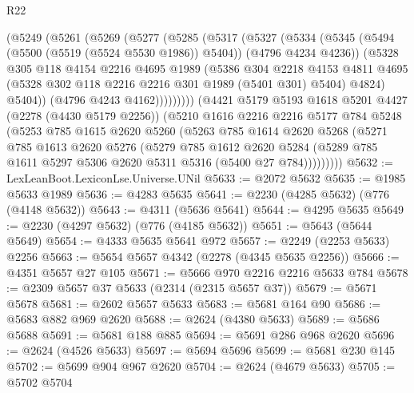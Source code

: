 \begin{lexlean}{R22}
\begin{coremodule}
        (@5249
          (@5261
            (@5269
              (@5277
                (@5285
                  (@5317
                    (@5327
                      (@5334
                        (@5345
                          (@5494 (@5500 (@5519 (@5524 @5530 @1986)) @5404))
                          (@4796 @4234 @4236))
                        (@5328
                          @305
                          @118
                          @4154
                          @2216
                          @4695
                          @1989
                          (@5386
                            @304
                            @2218
                            @4153
                            @4811
                            @4695
                            (@5328 @302 @118 @2216 @2216 @301 @1989 (@5401 @301) @5404)
                            @4824)
                          @5404))
                      (@4796 @4243 @4162)))))))))
      (@4421
        @5179
        @5193
        @1618
        @5201
        @4427
        (@2278 (@4430 @5179 @2256))
        (@5210
          @1616
          @2216
          @2216
          @5177
          @784
          @5248
          (@5253
            @785
            @1615
            @2620
            @5260
            (@5263
              @785
              @1614
              @2620
              @5268
              (@5271
                @785
                @1613
                @2620
                @5276
                (@5279
                  @785
                  @1612
                  @2620
                  @5284
                  (@5289 @785 @1611 @5297 @5306 @2620 @5311 @5316 (@5400 @27 @784)))))))))
@5632 := LexLeanBoot.LexiconLse.Universe.UNil
@5633 := @2072 @5632
@5635 := @1985 @5633 @1989
@5636 := @4283 @5635
@5641 := @2230 (@4285 @5632) (@776 (@4148 @5632))
@5643 := @4311 (@5636 @5641)
@5644 := @4295 @5635
@5649 := @2230 (@4297 @5632) (@776 (@4185 @5632))
@5651 := @5643 (@5644 @5649)
@5654 := @4333 @5635 @5641 @972
@5657 := @2249 (@2253 @5633) @2256
@5663 := @5654 @5657 @4342 (@2278 (@4345 @5635 @2256))
@5666 := @4351 @5657 @27 @105
@5671 := @5666 @970 @2216 @2216 @5633 @784
@5678 := @2309 @5657 @37 @5633 (@2314 (@2315 @5657 @37))
@5679 := @5671 @5678
@5681 := @2602 @5657 @5633
@5683 := @5681 @164 @90
@5686 := @5683 @882 @969 @2620
@5688 := @2624 (@4380 @5633)
@5689 := @5686 @5688
@5691 := @5681 @188 @885
@5694 := @5691 @286 @968 @2620
@5696 := @2624 (@4526 @5633)
@5697 := @5694 @5696
@5699 := @5681 @230 @145
@5702 := @5699 @904 @967 @2620
@5704 := @2624 (@4679 @5633)
@5705 := @5702 @5704

\end{coremodule}
\end{lexlean}
